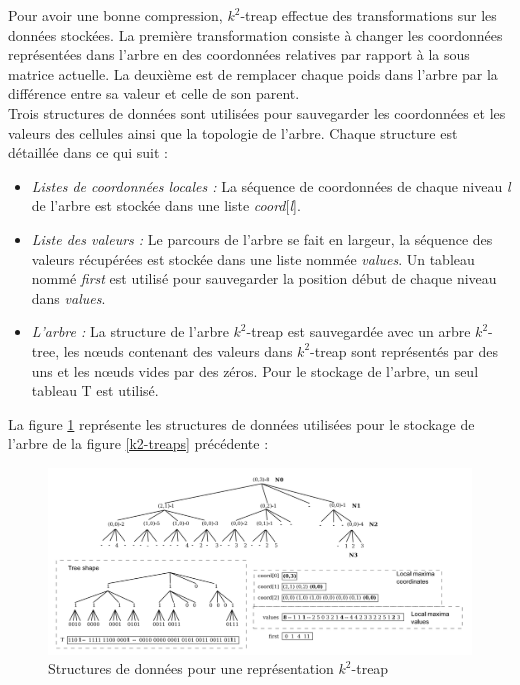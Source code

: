 Pour avoir une bonne compression, $k^2$-treap effectue des transformations sur les données stockées. La première transformation consiste à changer les coordonnées représentées dans l'arbre en des coordonnées relatives par rapport à la sous matrice actuelle. La deuxième est de remplacer chaque poids dans l'arbre par la différence entre sa valeur et celle de son parent.\\
Trois structures de données sont utilisées pour sauvegarder les coordonnées et les valeurs des cellules ainsi que la topologie de l'arbre. Chaque structure est détaillée dans ce qui suit :
\begin{itemize}
\item \textit{Listes de coordonnées locales :} La séquence de coordonnées de chaque niveau \textit{l} de l'arbre est stockée dans une liste \textit{coord}[\textit{l}].
\item \textit{Liste des valeurs : } Le parcours de l'arbre se fait en largeur, la séquence des valeurs récupérées est stockée dans une liste nommée \textit{values}. Un tableau nommé \textit{first} est utilisé pour sauvegarder la position début de chaque niveau dans \textit{values}.
\item \textit{L'arbre :} La structure de l'arbre $k^2$-treap est sauvegardée avec un arbre $k^2$-tree, les nœuds contenant des valeurs dans $k^2$-treap sont représentés par des uns et les nœuds vides par des zéros. Pour le stockage de l'arbre, un seul tableau T est utilisé. 
\end{itemize}

La figure \ref{k2-treaps-structure} représente les structures de données utilisées pour le stockage de l'arbre de la figure \ref{k2-treaps} précédente \citep{badr2013traitement} :

\begin{figure}[H]
\begin{center}
\includegraphics[height=200 pt, width=380 pt]{./ressources/image/k2-treaps-structure.png} 
\end{center}
\caption{Structures de données pour une représentation $k^2$-treap}
\label{k2-treaps-structure}
\end{figure}


